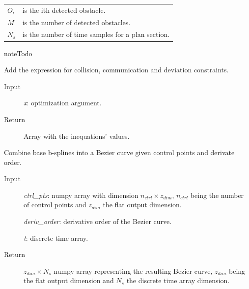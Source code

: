 \documentclass[letterpaper,10pt,english]{sphinxmanual}
\begin{document}
\begin{fulllineitems}
\begin{fulllineitems}
\begin{description}
\begin{tabulary}{\linewidth}{|L|L|}
\(O_i\)
 & 
is the ith detected obstacle.
\\

\(M\)
 & 
is the number of detected obstacles.
\\

\(N_s\)
 & 
is the number of time samples for a plan section.
\\
\hline\end{tabulary}


\end{description}

\begin{notice}{note}{Todo}

Add the expression for collision, communication and deviation constraints.
\end{notice}
\begin{description}
\item[{Input}] \leavevmode
\emph{x}: optimization argument.

\item[{Return}] \leavevmode
Array with the inequations' values.

\end{description}

\end{fulllineitems}


\begin{fulllineitems}
\label{Multi-robot motion planner:planning_sim.Robot._comb_bsp}
Combine base b-splines into a Bezier curve given control points and derivate order.
\begin{description}
\item[{Input}] \leavevmode
\emph{ctrl\_pts}: numpy array with dimension \(n_{ctrl}\times z_{dim}\), \(n_{ctrl}\)
being the number of
control points and \(z_{dim}\) the flat output dimension.

\emph{deriv\_order}: derivative order of the Bezier curve.

\emph{t}: discrete time array.

\item[{Return}] \leavevmode
\(z_{dim}\times N_s\) numpy array representing the resulting Bezier curve,
\(z_{dim}\) being
the flat output dimension and \(N_{s}\) the discrete time array dimension.

\end{description}


\end{fulllineitems}
\end{fulllineitems}
\end{document}
